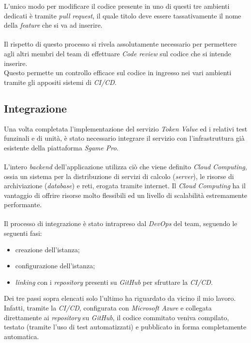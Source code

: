 \documentclass[11pt]{thesistemp}
\begin{document}
L'unico modo per modificare il codice presente in uno di questi tre ambienti dedicati è tramite \textit{pull request}, il quale titolo deve essere tassativamente il nome della \textit{feature} che si va ad inserire.\\\\
Il rispetto di questo processo si rivela assolutamente necessario per permettere agli altri membri del team di effettuare \textit{Code review} sul codice che si intende inserire.\\
Questo permette un controllo efficace sul codice in ingresso nei vari ambienti tramite gli appositi sistemi di \textit{CI/CD}.

\pagebreak
\subsection{Integrazione}
Una volta completata l'implementazione del servizio \textit{Token Value} ed i relativi test funzinali e di unità, è stato necessario integrare il servizio con l'infrastruttura già esistente della piattaforma \textit{Sgame Pro}.\\\\
L'intero \textit{backend} dell'applicazione utilizza ciò che viene definito \textit{Cloud Computing}, ossia un sistema per la distribuzione di servizi di calcolo (\textit{server}), le risorse di archiviazione (\textit{database}) e reti, erogata tramite internet.
Il \textit{Cloud Computing} ha il vantaggio di offrire risorse molto flessibili ed un livello di scalabilità estremamente performante.\\\\
Il processo di integrazione è stato intrapreso dal \textit{DevOps} del team, seguendo le seguenti fasi:
\begin{itemize}
	\item creazione dell'istanza;
	\item configurazione dell'istanza;
	\item \textit{linking} con i \textit{repository} presenti su \textit{GitHub} per sfruttare la \textit{CI/CD}.
\end{itemize}
Dei tre passi sopra elencati solo l'ultimo ha riguardato da vicino il mio lavoro.\\
Infatti, tramite la \textit{CI/CD}, configurata con \textit{Microsoft Azure} e collegata direttamente ai \textit{repository} su \textit{GitHub}, il codice commitato veniva compilato, testato (tramite l'uso di test automatizzati) e pubblicato in forma completamente automatica.\\
\end{document}
